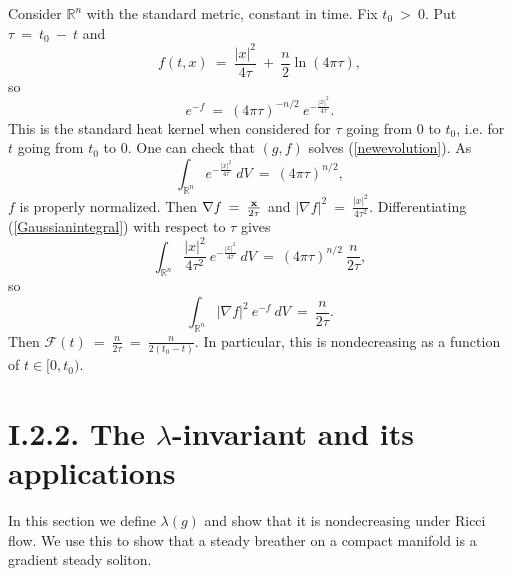 \documentclass[12pt]{amsart}
\newcommand{\R}{{\mathbb R}}
\numberwithin{equation}{section}
\theoremstyle{plain}
\theoremstyle{definition}
\theoremstyle{remark}
\begin{document}
Consider $\R^n$ with the standard metric, constant in time.
Fix $t_0 \: > \: 0$. Put $\tau \: = \: t_0 \: - \: t$ and
\begin{equation}
f(t, x) \: = \: \frac{|x|^2}{4\tau} \: + \: \frac{n}{2} \ln(4 \pi \tau),
\end{equation}
so
\begin{equation}
e^{-f} \: = \: (4 \pi \tau)^{-n/2} \: e^{- \frac{|x|^2}{4\tau}}.
\end{equation}
This is the standard heat kernel when considered for $\tau$ going from
$0$ to $t_0$, i.e. for $t$ going from $t_0$ to $0$.
One can check that $(g,f)$ solves (\ref{newevolution}).
As
\begin{equation} \label{Gaussianintegral}
\int_{\R^n} e^{- \frac{|x|^2}{4\tau}} \: dV \: = \: (4 \pi \tau)^{n/2}, 
\end{equation}
$f$ is properly normalized.
Then $\nabla f \: = \: \frac{{\bf x}}{2 \tau}$ and 
$|\nabla f|^2 \: = \: \frac{|x|^2}{4 \tau^2}$.
Differentiating (\ref{Gaussianintegral}) with respect to $\tau$ gives
\begin{equation} \label{Gaussianintegral2}
\int_{\R^n} \frac{|x|^2}{4\tau^2} \: 
e^{- \frac{|x|^2}{4\tau}} \: dV \: = \: (4 \pi \tau)^{n/2} \: 
\frac{n}{2\tau}, 
\end{equation}
so
\begin{equation}
\int_{\R^n} |\nabla f|^2 \: e^{- f} \: dV \: = \: \frac{n}{2\tau}.
\end{equation}
Then ${\mathcal F}(t) \: = \: \frac{n}{2\tau} \: = \: \frac{n}{2(t_0-t)}$.
In particular, this is nondecreasing as a function of 
$t \in [0, t_0)$.

\section{I.2.2. The $\lambda$-invariant and its applications} 
\label{I.2.2}

In this section we define $\lambda(g)$ and show that it is nondecreasing under
Ricci flow.  We use this to show that a steady breather on a compact manifold
is a gradient steady soliton.
\end{document}
